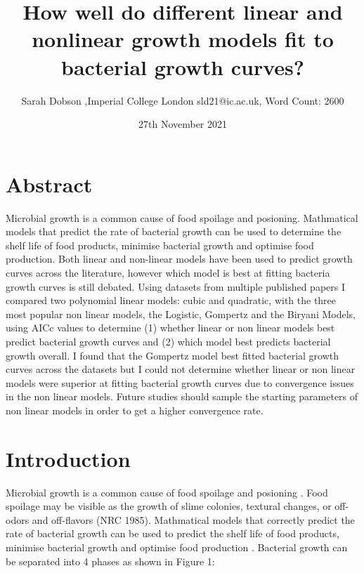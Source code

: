\documentclass[titlepage]{article}
\title{How well do different linear and nonlinear growth models fit to bacterial growth curves?}
\author{Sarah Dobson ,Imperial College London sld21@ic.ac.uk, Word Count: 2600}
\date{27th November 2021}
\begin{document}
  \maketitle
  \section{Abstract}
  
Microbial growth is a common cause of food spoilage and posioning. Mathmatical models that predict the rate of bacterial growth can be used to determine the shelf life of food products, minimise bacterial growth and optimise food production. Both linear and non-linear models have been used to predict growth curves across the literature, however which model is best at fitting bacteria growth curves is still debated. Using datasets from multiple published papers I compared two polynomial linear models: cubic and quadratic, with the three most popular non linear models, the Logistic, Gompertz and the Biryani Models, using AICc values to determine (1) whether linear or non linear models best predict bacterial growth curves and (2) which model best predicts bacterial growth overall. I found that the Gompertz model best fitted bacterial growth curves across the datasets but I could not determine whether linear or non linear models were superior at fitting bacterial growth curves due to convergence issues in the non linear models. Future studies should sample the starting parameters of non linear models in order to get a higher convergence rate.
  
  \section{Introduction}
  
Microbial growth is a common cause of food spoilage and posioning \cite{peleg2011microbial}. Food spoilage may be visible as the growth of slime colonies, textural changes, or off-odors and off-flavors (NRC 1985). Mathmatical models that correctly predict the rate of bacterial growth can be used to predict the shelf life of food products, minimise bacterial growth and optimise food production \cite{baranyi1994dynamic}. Bacterial growth can be separated into 4 phases as shown in Figure 1:
  
\end{document}
